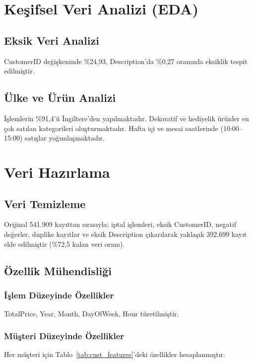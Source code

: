 \documentclass[conference]{IEEEtran}
\begin{document}
\section{Keşifsel Veri Analizi (EDA)}

\subsection{Eksik Veri Analizi}
CustomerID değişkeninde \%24,93, Description'da \%0,27 oranında eksiklik tespit edilmiştir.

\subsection{Ülke ve Ürün Analizi}
İşlemlerin \%91,4'ü İngiltere'den yapılmaktadır. Dekoratif ve hediyelik ürünler en çok satılan kategorileri oluşturmaktadır. Hafta içi ve mesai saatlerinde (10:00--15:00) satışlar yoğunlaşmaktadır.

\section{Veri Hazırlama}

\subsection{Veri Temizleme}
Orijinal 541.909 kayıttan sırasıyla: iptal işlemleri, eksik CustomerID, negatif değerler, duplike kayıtlar ve eksik Description çıkarılarak yaklaşık 392.699 kayıt elde edilmiştir (\%72,5 kalan veri oranı).

\subsection{Özellik Mühendisliği}

\subsubsection{İşlem Düzeyinde Özellikler}
TotalPrice, Year, Month, DayOfWeek, Hour türetilmiştir.

\subsubsection{Müşteri Düzeyinde Özellikler}
Her müşteri için Tablo~\ref{tab:cust_features}'deki özellikler hesaplanmıştır.
\end{document}
